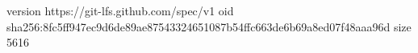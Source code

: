 version https://git-lfs.github.com/spec/v1
oid sha256:8fc5ff947ec9d6de89ae87543324651087b54ffc663de6b69a8ed07f48aaa96d
size 5616

